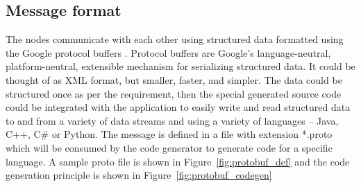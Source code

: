 \subsection{Message format}
The nodes communicate with each other using structured data formatted using the Google protocol buffers \cite{ProtocolBuffers}. Protocol buffers are Google's language-neutral, platform-neutral, extensible mechanism for serializing structured data. It could be thought of as XML format, but smaller, faster, and simpler. The data could be structured once as per the requirement, then the special generated source code could be integrated with the application to easily write and read structured data to and from a variety of data streams and using a variety of languages – Java, C++, C\# or Python. The message is defined in a file with extension *.proto which will be consumed by the code generator to generate code for a specific language. A sample proto file is shown in Figure~\ref{fig:protobuf_def} and the code generation principle is shown in Figure~\ref{fig:protobuf_codegen}

